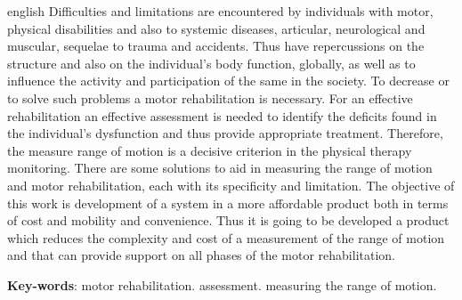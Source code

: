 \begin{resumo}[Abstract]
 \begin{otherlanguage*}{english}
Difficulties and limitations are encountered by individuals with motor, physical
disabilities and also to systemic diseases, articular, neurological and muscular,
 sequelae to trauma and accidents. Thus have repercussions on the structure and
 also on the individual's body function, globally, as well as to influence the
activity and  participation of the same in the society. To decrease or to solve such problems
 a motor rehabilitation is necessary. For an effective rehabilitation an effective
 assessment is needed to identify the deficits found in the individual's dysfunction
 and thus provide appropriate treatment. Therefore, the measure range of motion
 is a decisive criterion in the physical therapy monitoring. There are some solutions
 to aid in measuring the range of motion and motor rehabilitation, each with its
 specificity and limitation. The objective of this work is development of a system in a more affordable
 product both in terms of cost and mobility and convenience. Thus it is going to be developed
 a product which reduces the complexity and cost of a measurement of the
 range of motion and that can provide support on all phases of the motor rehabilitation.
   \vspace{\onelineskip}

   \noindent
   \textbf{Key-words}: motor rehabilitation. assessment. measuring the range of motion.
 \end{otherlanguage*}
\end{resumo}
